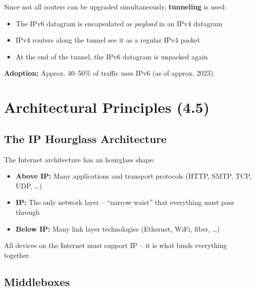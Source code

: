 \begin{keybox}
Since not all routers can be upgraded simultaneously, \textbf{tunneling} is used:
\begin{itemize}[noitemsep]
    \item The IPv6 datagram is encapsulated as \emph{payload} in an IPv4 datagram
    \item IPv4 routers along the tunnel see it as a regular IPv4 packet
    \item At the end of the tunnel, the IPv6 datagram is unpacked again
\end{itemize}

\textbf{Adoption:} Approx. 40--50\% of traffic uses IPv6 (as of approx. 2023).
\end{keybox}

\section{Architectural Principles (4.5)}

\subsection{The IP Hourglass Architecture}

\begin{keybox}
The Internet architecture has an hourglass shape:
\begin{itemize}[noitemsep]
    \item \textbf{Above IP:} Many applications and transport protocols (HTTP, SMTP, TCP, UDP, \ldots)
    \item \textbf{IP:} The only network layer -- ``narrow waist'' that everything must pass through
    \item \textbf{Below IP:} Many link layer technologies (Ethernet, WiFi, fiber, \ldots)
\end{itemize}
All devices on the Internet must support IP -- it is what binds everything together.
\end{keybox}

\subsection{Middleboxes}

